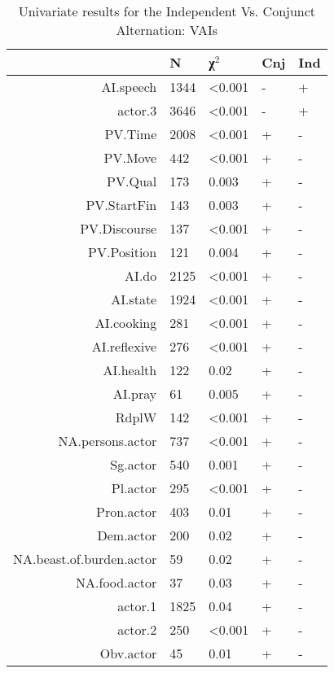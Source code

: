 \begin{table}[H]
  \centering
  \footnotesize
\begin{tabular}{rllll}
    \toprule
 & N & χ$^{2}$ & Cnj & Ind \\ 
\midrule
AI.speech        & 1344 & \textless{}0.001 & - & + \\
actor.3          & 3646 & \textless{}0.001 & - & + \\
PV.Time          & 2008 & \textless{}0.001 & + & - \\
PV.Move          & 442 & \textless{}0.001 & + & - \\
PV.Qual          & 173 & 0.003 & + & - \\
PV.StartFin      & 143 & 0.003 & + & - \\
PV.Discourse     & 137 & \textless{}0.001 & + & - \\
PV.Position      & 121 & 0.004 & + & - \\
AI.do            & 2125 & \textless{}0.001 & + & - \\
AI.state         & 1924 & \textless{}0.001 & + & - \\
AI.cooking       & 281 & \textless{}0.001 & + & - \\
AI.reflexive     & 276 & \textless{}0.001 & + & - \\
AI.health        & 122 & 0.02 & + & - \\
AI.pray          & 61 & 0.005 & + & - \\
RdplW            & 142      & \textless{}0.001 & + & - \\
NA.persons.actor & 737 & \textless{}0.001 & + & - \\
Sg.actor         & 540 & 0.001 & + & - \\
Pl.actor         & 295 & \textless{}0.001 & + & - \\
Pron.actor       & 403 & 0.01 & + & - \\
Dem.actor        & 200 & 0.02 & + & - \\
NA.beast.of.burden.actor & 59 & 0.02 & + & - \\
NA.food.actor    & 37 & 0.03 & + & - \\
actor.1          & 1825 & 0.04 & + & - \\
actor.2          & 250 & \textless{}0.001 & + & - \\
Obv.actor        & 45 & 0.01 & + & - \\

  \bottomrule
  \end{tabular}
  \caption{
   Univariate results for the Independent Vs. Conjunct Alternation: VAIs \\ \label{tab:aincnjuni}
  }
\end{table}


